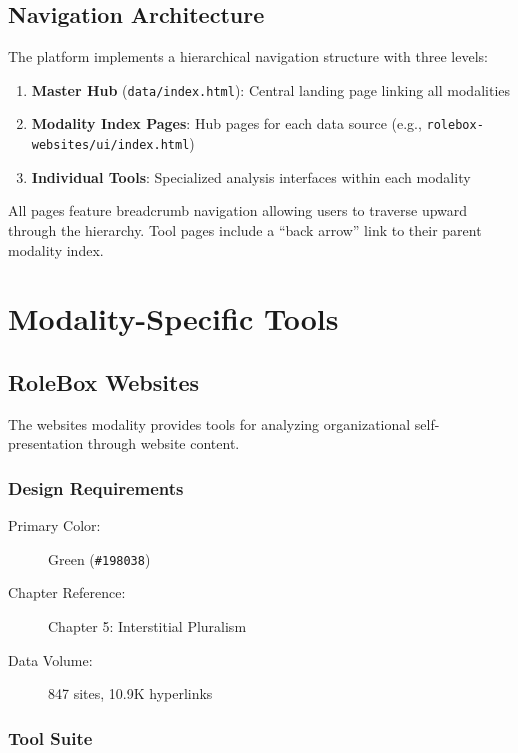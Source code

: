 \subsection{Navigation Architecture}

The platform implements a hierarchical navigation structure with three levels:

\begin{enumerate}
    \item \textbf{Master Hub} (\texttt{data/index.html}): Central landing page linking all modalities
    \item \textbf{Modality Index Pages}: Hub pages for each data source (e.g., \texttt{rolebox-websites/ui/index.html})
    \item \textbf{Individual Tools}: Specialized analysis interfaces within each modality
\end{enumerate}

All pages feature breadcrumb navigation allowing users to traverse upward through the hierarchy. Tool pages include a ``back arrow'' link to their parent modality index.

\section{Modality-Specific Tools}

\subsection{RoleBox Websites}

The websites modality provides tools for analyzing organizational self-presentation through website content.

\subsubsection{Design Requirements}

\begin{description}
    \item[Primary Color:] Green (\texttt{\#198038})
    \item[Chapter Reference:] Chapter 5: Interstitial Pluralism
    \item[Data Volume:] 847 sites, 10.9K hyperlinks
\end{description}

\subsubsection{Tool Suite}

